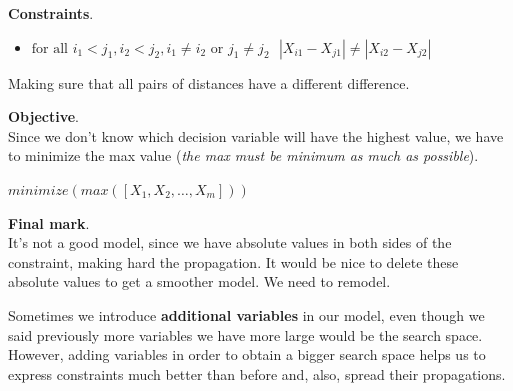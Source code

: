 \begin{example}[title = Golomb ruler problem]
    \textbf{Constraints}.
    \begin{itemize}
        \renewcommand{\labelitemi}{-}
        \item $\text{for all } i_1 < j_1, i_2 < j_2, i_1 \neq i_2 \text{ or } j_1 \neq j_2 \text{ } |X_{i1} - X_{j1}| \neq |X_{i2} - X_{j2}|$
    \end{itemize}
    Making sure that all pairs of distances have a different difference. \vspace{7pt}

    \textbf{Objective}. \\
    Since we don't know which decision variable will have the highest value, we have to minimize the max value (\textit{the max must be minimum as much as 
    possible}). \vspace{1.5pt} 
    \begin{center}
        $\textit{minimize}(\textit{max}([X_1, X_2, \dots, X_m]))$
    \end{center} \vspace{7pt}

    \textbf{Final mark}. \\
    It's not a good model, since we have absolute values in both sides of the constraint, making hard the propagation. It would be nice to delete these 
    absolute values to get a smoother model. We need to remodel.
\end{example} 
Sometimes we introduce \textbf{additional variables} in our model, even though we said previously more variables we have more large would be the search space.
However, adding variables in order to obtain a bigger search space helps us to express constraints much better than before and, also, spread their propagations.
